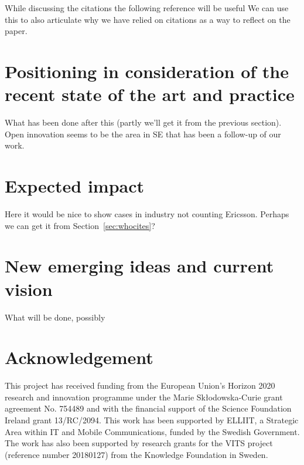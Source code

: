 \documentclass[sigplan]{acmart}
\begin{document}
While discussing the citations the following reference will be useful \cite{penders2018ten} We can use this to also articulate why we have relied on citations as a way to reflect on the paper.


\section{Positioning in consideration of the recent state of the art and practice}\label{sec:soa} 
What has been done after this (partly we'll get it from the previous section).
Open innovation seems to be the area in SE that has been a follow-up of our work.

\section{Expected impact}\label{sec:impact}
Here it would be nice to show cases in industry not counting Ericsson. Perhaps we can get it from Section~\ref{sec:whocites}?



\section{New emerging ideas and current vision}\label{sec:fw} 
What will be done, possibly

\section*{Acknowledgement}
This project has received funding from the European Union's Horizon 2020 research and innovation programme under the Marie Skłodowska-Curie grant agreement No. 754489 and with the financial support of the Science Foundation Ireland grant 13/RC/2094. This work has been supported by ELLIIT, a Strategic Area within IT and Mobile Communications, funded by the Swedish Government. The work has also been supported by research grants for the VITS project (reference number 20180127) from the Knowledge Foundation in Sweden.









\end{document}
